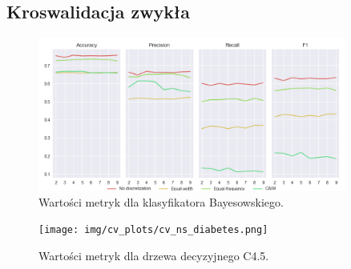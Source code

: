 \subsection*{Kroswalidacja zwykła}

\begin{figure}[H]
    \center
    \includegraphics[width=0.9\textwidth]{img/cv_scores_kfold/scoring_kfold_diabetes.png}
    \caption{Wartości metryk dla klasyfikatora Bayesowskiego.}
\end{figure}

\begin{figure}[H]
    \center
    \texttt{[image: img/cv\_plots/cv\_ns\_diabetes.png]}
    \caption{Wartości metryk dla drzewa decyzyjnego C4.5.}
\end{figure}

